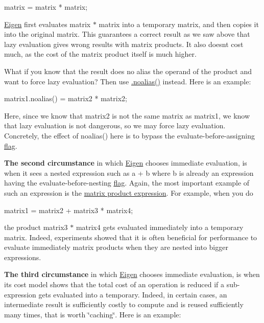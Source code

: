 \begin{DoxyCode}
matrix = matrix * matrix; 
\end{DoxyCode}


\hyperlink{namespace_eigen}{Eigen} first evaluates {\ttfamily matrix $\ast$ matrix} into a temporary matrix, and then copies it into the original {\ttfamily matrix}. This guarantees a correct result as we saw above that lazy evaluation gives wrong results with matrix products. It also doesn\textquotesingle{}t cost much, as the cost of the matrix product itself is much higher.

What if you know that the result does no alias the operand of the product and want to force lazy evaluation? Then use \hyperlink{group___core___module_a2c1085de7645f23f240876388457da0b}{.noalias()} instead. Here is an example\+:


\begin{DoxyCode}
matrix1.noalias() = matrix2 * matrix2; 
\end{DoxyCode}


Here, since we know that matrix2 is not the same matrix as matrix1, we know that lazy evaluation is not dangerous, so we may force lazy evaluation. Concretely, the effect of noalias() here is to bypass the evaluate-\/before-\/assigning \hyperlink{group__flags}{flag}.

{\bfseries The second circumstance} in which \hyperlink{namespace_eigen}{Eigen} chooses immediate evaluation, is when it sees a nested expression such as {\ttfamily a + b} where {\ttfamily b} is already an expression having the evaluate-\/before-\/nesting \hyperlink{group__flags}{flag}. Again, the most important example of such an expression is the \hyperlink{group___core___module}{matrix product expression}. For example, when you do


\begin{DoxyCode}
matrix1 = matrix2 + matrix3 * matrix4; 
\end{DoxyCode}


the product {\ttfamily matrix3 $\ast$ matrix4} gets evaluated immediately into a temporary matrix. Indeed, experiments showed that it is often beneficial for performance to evaluate immediately matrix products when they are nested into bigger expressions.

{\bfseries The third circumstance} in which \hyperlink{namespace_eigen}{Eigen} chooses immediate evaluation, is when its cost model shows that the total cost of an operation is reduced if a sub-\/expression gets evaluated into a temporary. Indeed, in certain cases, an intermediate result is sufficiently costly to compute and is reused sufficiently many times, that is worth \char`\"{}caching\char`\"{}. Here is an example\+:


